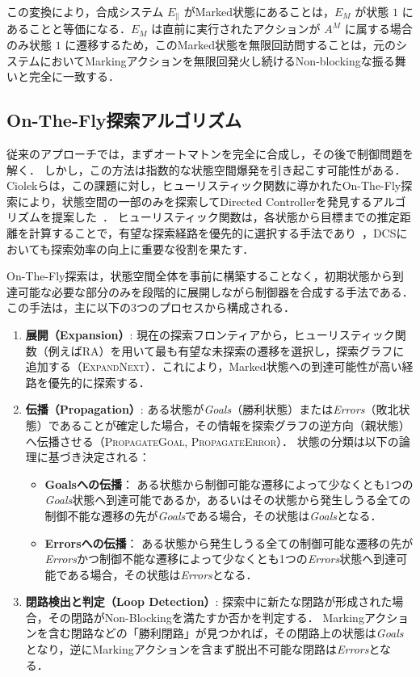 \documentclass[a4paper,11pt,oneside,openany,report,dvipdfmx]{jsbook}
\begin{document}
この変換により，合成システム $E_\parallel$ がMarked状態にあることは，$E_M$ が状態 $1$ にあることと等価になる．$E_M$ は直前に実行されたアクションが $A^M$ に属する場合のみ状態 $1$ に遷移するため，このMarked状態を無限回訪問することは，元のシステムにおいてMarkingアクションを無限回発火し続けるNon-blockingな振る舞いと完全に一致する．

\subsection{On-The-Fly探索アルゴリズム}

従来のアプローチでは，まずオートマトンを完全に合成し，その後で制御問題を解く．
しかし，この方法は指数的な状態空間爆発を引き起こす可能性がある．
Ciolekらは，この課題に対し，ヒューリスティック関数に導かれたOn-The-Fly探索により，状態空間の一部のみを探索してDirected Controllerを発見するアルゴリズムを提案した~\cite{DirectedControllerSynthesis}．
ヒューリスティック関数は，各状態から目標までの推定距離を計算することで，有望な探索経路を優先的に選択する手法であり~\cite{Heuristic}，DCSにおいても探索効率の向上に重要な役割を果たす．

On-The-Fly探索は，状態空間全体を事前に構築することなく，初期状態から到達可能な必要な部分のみを段階的に展開しながら制御器を合成する手法である．
この手法は，主に以下の3つのプロセスから構成される．

\begin{enumerate}
  \item \textbf{展開（Expansion）}:
        現在の探索フロンティアから，ヒューリスティック関数（例えばRA）を用いて最も有望な未探索の遷移を選択し，探索グラフに追加する（\textsc{ExpandNext}）．これにより，Marked状態への到達可能性が高い経路を優先的に探索する．
  \item \textbf{伝播（Propagation）}:
        ある状態が\textit{Goals}（勝利状態）または\textit{Errors}（敗北状態）であることが確定した場合，その情報を探索グラフの逆方向（親状態）へ伝播させる（\textsc{PropagateGoal}, \textsc{PropagateError}）．
        状態の分類は以下の論理に基づき決定される：
        \begin{itemize}
          \item \textbf{Goalsへの伝播}：
                ある状態から制御可能な遷移によって少なくとも1つの\textit{Goals}状態へ到達可能であるか，あるいはその状態から発生しうる全ての制御不能な遷移の先が\textit{Goals}である場合，その状態は\textit{Goals}となる．
          \item \textbf{Errorsへの伝播}：
                ある状態から発生しうる全ての制御可能な遷移の先が\textit{Errors}かつ制御不能な遷移によって少なくとも1つの\textit{Errors}状態へ到達可能である場合，その状態は\textit{Errors}となる．
        \end{itemize}
  \item \textbf{閉路検出と判定（Loop Detection）}:
        探索中に新たな閉路が形成された場合，その閉路がNon-Blockingを満たすか否かを判定する．
        Markingアクションを含む閉路などの「勝利閉路」が見つかれば，その閉路上の状態は\textit{Goals}となり，逆にMarkingアクションを含まず脱出不可能な閉路は\textit{Errors}となる．
\end{enumerate}
\end{document}
